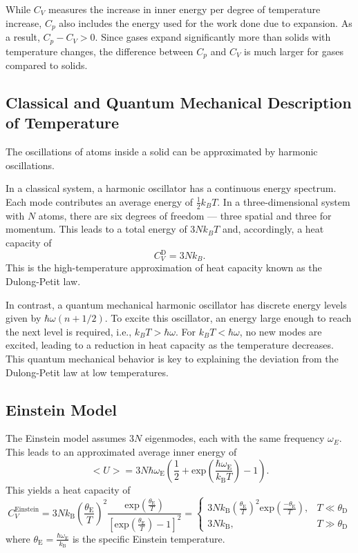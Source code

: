 While $C_V$ measures the increase in inner energy per degree of 
temperature increase, $C_p$ also includes the energy used for the work 
done due to expansion. As a result, $C_p-C_V>0$. Since gases expand 
significantly more than solids with temperature changes, the difference between 
$C_p$ and $C_V$ is much larger for gases compared to solids.

\subsection{Classical and Quantum Mechanical Description of Temperature}
The oscillations of atoms inside a solid can be approximated by 
harmonic oscillations. 

In a classical system, a harmonic oscillator has a continuous energy spectrum.
Each mode contributes an average energy of $\frac{1}{2}k_BT$. 
In a three-dimensional system with $N$ atoms, 
there are six degrees of freedom — three spatial and three for momentum.
This leads to a total energy of $3Nk_BT$ and, accordingly, 
a heat capacity of 
\begin{equation}
    C_V^\text{D}=3Nk_B. 
    \label{eqn:dulongpetit}    
\end{equation}
This is the high-temperature approximation of heat capacity known as the Dulong-Petit law.

In contrast, a quantum mechanical harmonic oscillator has discrete energy levels 
given by $\hbar\omega(n+1/2)$. To excite this oscillator, an energy 
large enough to reach the next level is required, i.e., $k_BT>\hbar\omega$.
For $k_BT<\hbar\omega$, no new modes are excited, leading to a reduction in heat capacity 
as the temperature decreases. This quantum mechanical behavior is key to explaining 
the deviation from the Dulong-Petit law at low temperatures.

\subsection{Einstein Model}
The Einstein model assumes $3N$ eigenmodes, each with the same frequency $\omega_E$.
This leads to an approximated average inner energy of 
\begin{equation}
    \bigl<U\bigr> = 3N \hbar\omega_\text{E} \left(\frac{1}{2} + \text{exp}\left(\frac{\hbar \omega_\text{E}}{k_\text{B}T}\right)
     - 1\right) .
\end{equation}
This yields a heat capacity of 
\begin{equation}
    C_V^\text{Einstein} = 3Nk_\text{B} \left(\frac{\theta_\text{E}}{T}\right)^2 \frac{\text{exp}\left(\frac{\theta_\text{E}}{T}\right)}
    {\left[\text{exp}\left(\frac{\theta_\text{E}}{T}\right) - 1\right]^2} = 
    \begin{cases}
        3Nk_\text{B} \left(\frac{\theta_\text{E}}{T}\right)^2 \text{exp}\left(\frac{-\theta_\text{E}}{T}\right), 
        & T \ll \theta_\text{D} \\
        3Nk_\text{B} , & T \gg \theta_\text{D}
    \end{cases}
\end{equation}
where $\theta_\text{E} = \frac{\hbar\omega_\text{E}}{k_\text{B}}$ is the specific 
Einstein temperature.

